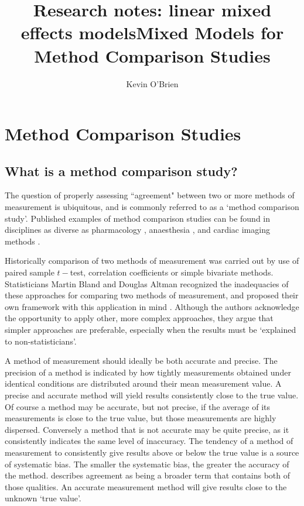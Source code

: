 \documentclass[12pt, a4paper]{report}
\title{Research notes: linear mixed effects models}
\author{ } \date{ }
\theoremstyle{plain}
\theoremstyle{definition}
\theoremstyle{remark}
\begin{document}
	\author{Kevin O'Brien}
	\title{Mixed Models for Method Comparison Studies}
	\tableofcontents
	
\newpage
\chapter{Method Comparison Studies}
	
\section{What is a method comparison study?}


The question of properly assessing ``agreement" between two or more methods of measurement is ubiquitous, and is commonly referred to as a `method comparison study'. Published examples of method comparison studies can be found in disciplines
as diverse as pharmacology \citep{ludbrook97}, anaesthesia \citep{Myles}, and cardiac imaging methods \citep{Krumm}.
	
Historically comparison of two methods of measurement was carried out by use of paired sample $t-$test, correlation coefficients or simple bivariate methods. Statisticians Martin Bland and Douglas Altman recognized the inadequacies of these approaches for comparing two methods of measurement, and proposed their own framework with this application in mind \citep{BA83,BA86}. Although the authors acknowledge the opportunity to apply other, more complex approaches, they argue that simpler approaches are preferable, especially when the results must be `explained to non-statisticians'.


A method of measurement should ideally be both accurate and
precise. The precision of a method is indicated by how tightly measurements obtained under identical conditions are distributed
around their mean measurement value. A precise and accurate method
will yield results consistently close to the true value. Of course
a method may be accurate, but not precise, if the average of its
measurements is close to the true value, but those measurements
are highly dispersed. Conversely a method that is not accurate may
be quite precise, as it consistently indicates the same level of
inaccuracy. The tendency of a method of measurement to
consistently give results above or below the true value is a
source of systematic bias. The smaller the systematic bias, the
greater the accuracy of the method. \citet{Barnhart} describes agreement as being a broader
term that contains both of those qualities. An accurate
measurement method will give results close to the unknown `true
value'.
\end{document}
